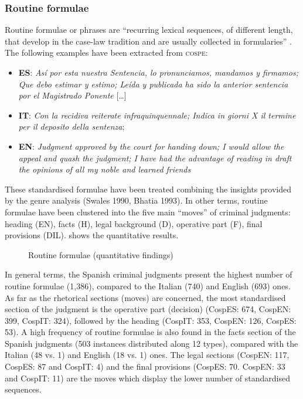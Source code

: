 \documentclass[output=paper]{LSP/langsci}
\begin{document}
\subsubsection{Routine formulae}
Routine formulae or phrases are “recurring lexical sequences, of different length, that develop in the case-law tradition and are usually collected in formularies” \citep[28--29]{Kjær1990}. The following examples have been extracted from \textsc{cospe}:

\begin{itemize}
\item \textbf{ES}: \textit{Así por esta nuestra Sentencia, lo pronunciamos, mandamos y firmamos; Que debo estimar y estimo; Leída y publicada ha sido la anterior sentencia por el Magistrado Ponente} […]
\item \textbf{IT}: \textit{Con la recidiva reiterate infraquinquennale; Indica in giorni X il termine per il deposito della sentenza};
\item \textbf{EN}: \textit{Judgment approved by the court for handing down; I would allow the appeal and quash the judgment; I have had the advantage of reading in draft the opinions of all my noble and learned friends}
\end{itemize}

These standardised formulae have been treated combining the insights provided by the genre analysis (Swales 1990, Bhatia 1993). In other terms, routine formulae have been clustered into the five main “moves” of criminal judgments: heading (EN), facts (H), legal background (D), operative part (F), final provisions (DIL).  shows the quantitative results.

\begin{figure}

\caption{Routine formulae (quantitative findings)} \label{fig:6:4}
\end{figure}

In general terms, the Spanish criminal judgments present the highest number of routine formulae (1,386), compared to the Italian (740) and English (693) ones. As far as the rhetorical sections (moves) are concerned, the most standardised section of the judgment is the operative part (decision) (CospES: 674, CospEN: 399, CospIT: 324), followed by the heading (CospIT: 353, CospEN: 126, CospES: 53). A high frequency of routine formulae is also found in the facts section of the Spanish judgments (503 instances distributed along 12 types), compared with the Italian (48 vs. 1) and English (18 vs. 1) ones. The legal sections (CospEN: 117, CospES: 87 and CospIT: 4) and the final provisions (CospES: 70. CospEN: 33 and CospIT: 11) are the moves which display the lower number of standardised sequences.
\end{document}
